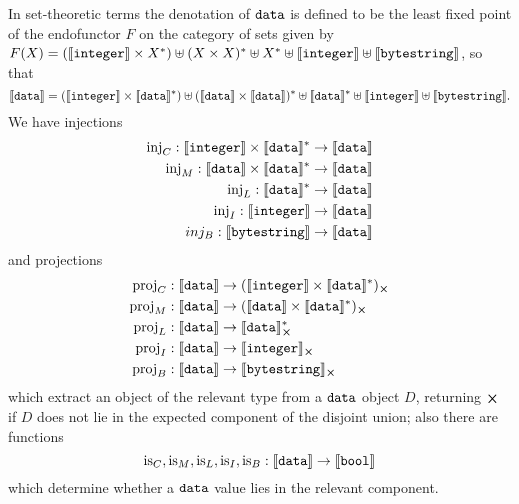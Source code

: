 \noindent In set-theoretic terms the denotation of $\mathtt{data}$ is
defined to be the least fixed point of the endofunctor $F$ on the category of
sets given by $F(X) = (\llbracket\mathit{\mathtt{integer}}\rrbracket \times X^*) \uplus (X \times X)^* \uplus
X^* \uplus \llbracket\mathit{\mathtt{integer}}\rrbracket \uplus \llbracket\mathit{\mathtt{bytestring}}\rrbracket$, so that
$$ \llbracket\mathit{\mathtt{data}}\rrbracket = (\llbracket\mathit{\mathtt{integer}}\rrbracket \times \llbracket\mathit{\mathtt{data}}\rrbracket^*)
               \uplus (\llbracket\mathit{\mathtt{data}}\rrbracket \times \llbracket\mathit{\mathtt{data}}\rrbracket)^*
               \uplus \llbracket\mathit{\mathtt{data}}\rrbracket^*
               \uplus \llbracket\mathit{\mathtt{integer}}\rrbracket
               \uplus \llbracket\mathit{\mathtt{bytestring}}\rrbracket.
$$
We have injections
\begin{align*}
  \operatorname{inj}_C: \llbracket\mathit{\mathtt{integer}}\rrbracket \times \llbracket\mathit{\mathtt{data}}\rrbracket^* & \to \llbracket\mathit{\mathtt{data}}\rrbracket \\
  \operatorname{inj}_M: \llbracket\mathit{\mathtt{data}}\rrbracket \times \llbracket\mathit{\mathtt{data}}\rrbracket^*  & \to \llbracket\mathit{\mathtt{data}}\rrbracket \\
  \operatorname{inj}_L: \llbracket\mathit{\mathtt{data}}\rrbracket^* & \to \llbracket\mathit{\mathtt{data}}\rrbracket \\
  \operatorname{inj}_I: \llbracket\mathit{\mathtt{integer}}\rrbracket & \to \llbracket\mathit{\mathtt{data}}\rrbracket \\
  inj_B: \llbracket\mathit{\mathtt{bytestring}}\rrbracket & \to \llbracket\mathit{\mathtt{data}}\rrbracket \\
\end{align*}
\noindent and projections
\begin{align*}
  \proj_C: \denote{\ty{data}} & \to \withError{(\denote{\ty{integer}} \times \denote{\ty{data}}^*)}\\
  \proj_M: \denote{\ty{data}} & \to \withError{(\denote{\ty{data}} \times \denote{\ty{data}}^*)}\\
  \proj_L: \denote{\ty{data}} & \to \withError{\denote{\ty{data}}^* }\\
  \proj_I: \denote{\ty{data}} & \to \withError{\denote{\ty{integer}}}\\
  \proj_B: \denote{\ty{data}} & \to \withError{\denote{\ty{bytestring}} }\\
\end{align*}
\noindent which extract an object of the relevant type from a $\mathtt{data}$ object
$D$, returning $\errorX$ if $D$ does not lie in the expected component of the
disjoint union; also there are functions
$$
\operatorname{is}_C, \operatorname{is}_M, \operatorname{is}_L, \operatorname{is}_I, \operatorname{is}_B: \llbracket\mathit{\mathtt{data}}\rrbracket \to \llbracket\mathit{\mathtt{bool}}\rrbracket
$$
\noindent which determine whether a $\mathtt{data}$ value lies in the relevant component.

